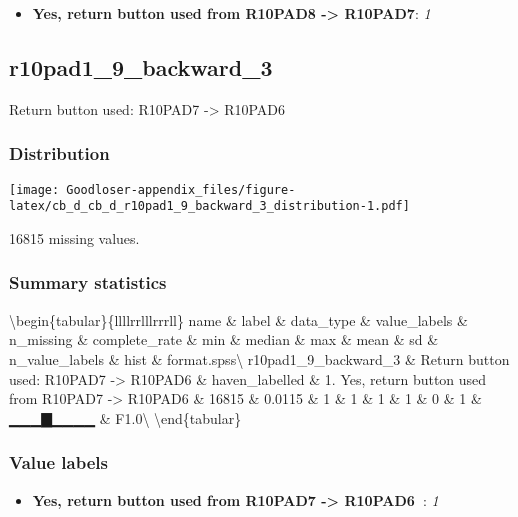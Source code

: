 \documentclass[
]{book}
\providecommand{\tightlist}{%
  \setlength{\itemsep}{0pt}\setlength{\parskip}{0pt}}
\begin{document}
\begin{itemize}
\tightlist
\item
  \textbf{Yes, return button used from R10PAD8 -\textgreater{} R10PAD7}: \emph{1}
\end{itemize}

\hypertarget{r10pad1_9_backward_3}{%
\subsection{r10pad1\_9\_backward\_3}\label{r10pad1_9_backward_3}}

Return button used: R10PAD7 -\textgreater{} R10PAD6

\hypertarget{r10pad1_9_backward_3_distribution}{%
\subsubsection{Distribution}\label{r10pad1_9_backward_3_distribution}}

\texttt{[image: Goodloser-appendix\_files/figure-latex/cb\_d\_cb\_d\_r10pad1\_9\_backward\_3\_distribution-1.pdf]}

16815 missing values.

\hypertarget{r10pad1_9_backward_3_summary}{%
\subsubsection{Summary statistics}\label{r10pad1_9_backward_3_summary}}

\textbackslash begin\{tabular\}\{l\textbar l\textbar l\textbar l\textbar r\textbar r\textbar l\textbar l\textbar l\textbar r\textbar r\textbar r\textbar l\textbar l\}
\hline
name \& label \& data\_type \& value\_labels \& n\_missing \& complete\_rate \& min \& median \& max \& mean \& sd \& n\_value\_labels \& hist \& format.spss\textbackslash{}
\hline
r10pad1\_9\_backward\_3 \& Return button used: R10PAD7 -\textgreater{} R10PAD6 \& haven\_labelled \& 1. Yes, return button used from R10PAD7 -\textgreater{} R10PAD6 \& 16815 \& 0.0115 \& 1 \& 1 \& 1 \& 1 \& 0 \& 1 \& ▁▁▁▇▁▁▁▁ \& F1.0\textbackslash{}
\hline
\textbackslash end\{tabular\}

\hypertarget{r10pad1_9_backward_3_labels}{%
\subsubsection{Value labels}\label{r10pad1_9_backward_3_labels}}

\begin{itemize}
\tightlist
\item
  \textbf{Yes, return button used from R10PAD7 -\textgreater{} R10PAD6~}: \emph{1}
\end{itemize}
\end{document}
